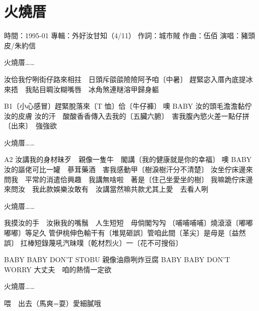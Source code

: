 \documentclass[UTF8,a4paper,oneside,twocolumn,12pt]{ctexbook}
\newcommand{\infopair}[2]{\textbullet #1：#2}
\newcommand{\zc}[1][伍佰]{\infopair{作詞}{#1}}
\newcommand{\zq}[1][伍佰]{\infopair{作曲}{#1}}
\newcommand{\zj}[1]{\infopair{專輯}{#1}}
\newcommand{\sj}[1]{\infopair{時間}{#1}}
\newenvironment{info}{\begin{flushleft}\kaishu
	}
	{\end{flushleft}\normalsize\yahei\par}
\newenvironment{lyric}{
	}
{}
\begin{document}
\section{火燒厝}
\begin{info}
	\sj{1995-01}
	\zj{外好汝甘知（4/11）}
	\zc[城市賊]
	\zq[伍佰]
	\infopair{演唱}{豬頭皮/朱約信}
\end{info}
\begin{lyric}
	火燒厝……

	汝佮我佇咧街仔路來相拄　日頭斥燄燄險險阿予咱〔中暑〕
	趕緊宓入厝內底提冰來捂　我貼目睭汝糊嘴唇　冰角煞連瞇溶甲歸身軀

	B1〔小心感冒〕趕緊脫落來〔T 恤〕佮〔牛仔褲〕
	噢 BABY 汝的頭毛澹澹黏佇汝的皮膚
	汝的汗　酸酸香香傳入去我的〔五臟六腑〕　害我腹內慾火差一點仔拼〔出來〕　強強欲

	火燒厝……

	A2 汝講我的身材昧歹　親像一隻牛　閣講〔我的健康就是你的幸福〕
	噢 BABY 汝的謳佬可比一罐　蔘茸藥酒　害我感動甲〔樹淚樹汗分不清楚〕
	汝坐佇床邊來問我　平常的消遣佮興趣　我講無啥啦　著是〔住己坐愛坐的樹〕
	我嘛跪佇床邊來問汝　我此款娛樂汝敢有　汝講當然嘛共款尤其上愛　去看人咧

	火燒厝……

	我摸汝的手　汝揪我的嘴鬚　人生短短　毋倘閣勼勼
	〔哺哺哺哺〕燒滾滾〔嘟嘟嘟嘟〕等足久
	管伊桃伸色輸干有〔堆晃砸誤〕管咱此間〔革尖〕是毋是〔益然誤〕
	扛棒短錄蔑吼汽昧噗〔乾材烈火〕一〔花不可搜俗〕

	BABY BABY DON'T STOBU 親像油鼎咧炸豆腐
	BABY BABY DON'T WORRY 大丈夫　咱的熱情一定欲

	火燒厝……

	喂　出去（馬爽=耍）愛細膩哦
\end{lyric}
\end{document}
